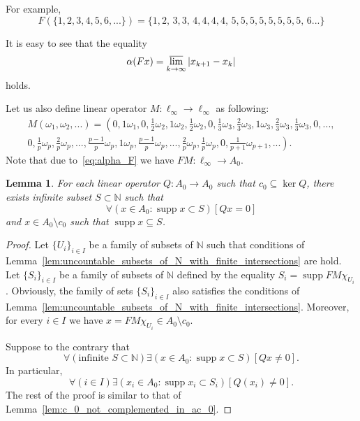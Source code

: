 \documentclass[a4paper,10pt]{article} %
\DeclareMathOperator{\supp}{supp}
\theoremstyle{plain}
\newtheorem{lemma}[theorem]{Lemma}
\theoremstyle{definition}
\begin{document}
For example,
$$
	F(\{1,2,3,4,5,6, ...\}) = \{1,2,\,3,3,\,4,4,4,4,\,5,5,5,5,5,5,5,5,\,6...\}
$$


It is easy to see that the equality
\begin{equation}
	\label{eq:alpha_F}
	\alpha(Fx) = \varlimsup_{k\to\infty} |x_{k+1} - x_{k}|
\end{equation}
holds.

Let us also define linear operator $M:\ell_\infty \to \ell_\infty$ as following:
\begin{multline*}
	M(\omega_1,\omega_2,...)=\left(
		0, 1\omega_1,
		0, \frac{1}{2}\omega_2, 1\omega_2, \frac{1}{2}\omega_2,
		0, \frac{1}{3}\omega_3, \frac{2}{3}\omega_3, 1\omega_3, \frac{2}{3}\omega_3, \frac{1}{3}\omega_3,
		0, ...,
	\right. \\ \left.
		0, \frac{1}{p}\omega_p, \frac{2}{p}\omega_p, ..., \frac{p-1}{p}\omega_p, 1\omega_p,
			\frac{p-1}{p}\omega_p, ..., \frac{2}{p}\omega_p, \frac{1}{p}\omega_p,
		0, \frac{1}{p+1}\omega_{p+1}, ...
	\right)
	.
\end{multline*}
Note that due to~\eqref{eq:alpha_F} we have $FM: \ell_\infty \to A_0$.


\begin{lemma}
	\label{lem:c_0_not_complemented_in_A_0}
	For each linear operator $Q: A_0 \to A_0$ such that $c_0\subseteq \ker Q$,
	there exists infinite subset $S \subset \mathbb{N}$ such that
	\begin{equation}
		\forall(x \in A_0 : \supp x \subset S)[Qx = 0]
	\end{equation}
	and $x\in A_0\setminus c_0$ such that $\supp x \subseteq S$.
\end{lemma}

\begin{proof}
	Let $\{U_i\}_{i \in I}$ be a family of subsets of $\mathbb{N}$
	such that conditions of Lemma~\ref{lem:uncountable_subsets_of_N_with_finite_intersections} are hold.
	Let $\{S_i\}_{i \in I}$ be a family of subsets of $\mathbb{N}$
	defined by the equality $S_i = \supp FM\chi_{U_i}$.
	Obviously, the family of sets $\{S_i\}_{i \in I}$ also
	satisfies the conditions of Lemma~\ref{lem:uncountable_subsets_of_N_with_finite_intersections}.
	Moreover, for every $i\in I$ we have $x = FM\chi_{U_i} \in A_0\setminus c_0$.

	Suppose to the contrary that
	\begin{equation}
		\forall(\mbox{infinite }S\subset\mathbb{N})\exists(x \in A_0 : \supp x \subset S)[Qx \neq 0]
		.
	\end{equation}
	In particular,
	\begin{equation}
		\forall(i\in I)\exists(x_i \in A_0 : \supp x_i \subset S_i)[Q(x_i) \neq 0]
		.
	\end{equation}
	The rest of the proof is similar to that of Lemma~\ref{lem:c_0_not_complemented_in_ac_0}.

\end{proof}
\end{document}

